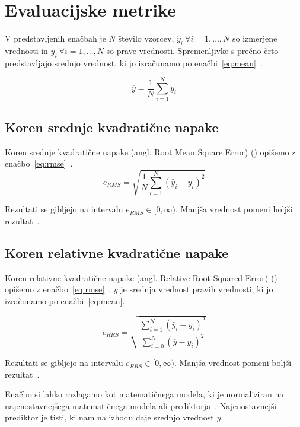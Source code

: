 \section{Evaluacijske metrike}
V predstavljenih enačbah je $N$ število vzorcev, $\hat{y}_i~ \forall i=1,\ldots,N$ so izmerjene vrednosti in $y_i ~\forall i=1,\ldots,N$ so prave vrednosti. Spremenljivke s prečno črto predstavljajo srednjo vrednost, ki jo izračunamo po enačbi~\eqref{eq:mean}~\cite{witten2005data}.

\begin{equation}
\overline{y} = \frac{1}{N} \sum_{i=1}^N y_i
\label{eq:mean}
\end{equation}


\subsection{Koren srednje kvadratične napake}
Koren srednje kvadratične napake (angl. Root Mean Square Error) (\rmse) opišemo z enačbo~\eqref{eq:rmse}~\cite{witten2005data}.
\begin{equation}
e_{RMS} = \sqrt{\frac{1}{N} \sum_{i=1}^{N}\left( \hat{y}_i - y_i \right)^2}
\label{eq:rmse}
\end{equation}

Rezultati se gibljejo na intervalu $e_{RMS} \in [0, \infty)$. Manjša vrednost pomeni boljši rezultat~\cite{witten2005data}.

\subsection{Koren relativne kvadratične napake}
Koren relativne kvadratične napake (angl. Relative Root Squared Error) (\rrse) opišemo z enačbo~\eqref{eq:rmse}~\cite{witten2005data}. $\overline{y}$ je srednja vrednost pravih vrednosti, ki jo izračunamo po enačbi~\eqref{eq:mean}.

\begin{equation}
e_{RRS} = \sqrt{\frac{\sum_{i=1}^{N} \left ( \hat{y}_i - y_i \right )^2}{\sum_{i=0}^{N} \left( \overline{y} - y_i \right)^2}}
\label{eq:rrse}
\end{equation}

Rezultati se gibljejo na intervalu $e_{RRS} \in [0, \infty)$. Manjša vrednost pomeni boljši rezultat~\cite{witten2005data}.

Enačbo si lahko razlagamo kot \rmse matematičnega modela, ki je normaliziran na \rmse najenostavnejšega matematičnega modela ali prediktorja~\cite{witten2005data}. Najenostavnejši prediktor je tisti, ki nam na izhodu daje srednjo vrednost $\overline{y}$. 


